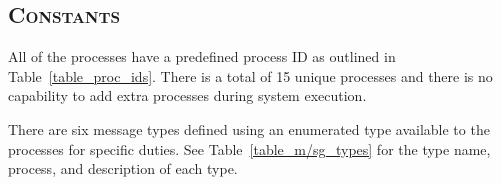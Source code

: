 \documentclass[oneside]{report}
\begin{document}
\subsection{\textsc{Constants}}
\label{sec:global_constants}


All of the processes have a predefined process ID as outlined in
Table~\ref{table_proc_ids}. There is a total of 15 unique processes and there
is no capability to add extra processes during system execution. 

\begin{table}[H]
    \caption{Process IDs}    
    \label{table_proc_ids}
\end{table}

There are six message types defined using an enumerated type available
to the processes for specific duties. See Table~\ref{table_m/sg_types}
for the type name, process, and description of each type.
\end{document}
